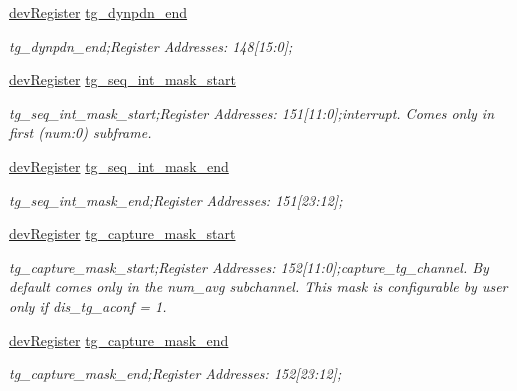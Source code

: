 \begin{DoxyCompactItemize}
\mbox{\hyperlink{classdev_register}{dev\+Register}} \mbox{\hyperlink{class_o_p_t3101_registers_a5f9e7026b200d2bcc0578376f30b9e16}{tg\+\_\+dynpdn\+\_\+end}}
\begin{DoxyCompactList}\small\item\em tg\+\_\+dynpdn\+\_\+end;Register Addresses\+: 148\mbox{[}15\+:0\mbox{]}; \end{DoxyCompactList}\item 
\mbox{\hyperlink{classdev_register}{dev\+Register}} \mbox{\hyperlink{class_o_p_t3101_registers_a7dbacbd8033f00547b6b465a49895a90}{tg\+\_\+seq\+\_\+int\+\_\+mask\+\_\+start}}
\begin{DoxyCompactList}\small\item\em tg\+\_\+seq\+\_\+int\+\_\+mask\+\_\+start;Register Addresses\+: 151\mbox{[}11\+:0\mbox{]};interrupt. Comes only in first (num\+:0) subframe. \end{DoxyCompactList}\item 
\mbox{\hyperlink{classdev_register}{dev\+Register}} \mbox{\hyperlink{class_o_p_t3101_registers_a3000807e764e22ef7ba00dd00a1c0198}{tg\+\_\+seq\+\_\+int\+\_\+mask\+\_\+end}}
\begin{DoxyCompactList}\small\item\em tg\+\_\+seq\+\_\+int\+\_\+mask\+\_\+end;Register Addresses\+: 151\mbox{[}23\+:12\mbox{]}; \end{DoxyCompactList}\item 
\mbox{\hyperlink{classdev_register}{dev\+Register}} \mbox{\hyperlink{class_o_p_t3101_registers_a4005716736ab2100c67ad96fd1ddb943}{tg\+\_\+capture\+\_\+mask\+\_\+start}}
\begin{DoxyCompactList}\small\item\em tg\+\_\+capture\+\_\+mask\+\_\+start;Register Addresses\+: 152\mbox{[}11\+:0\mbox{]};capture\+\_\+tg\+\_\+channel. By default comes only in the num\+\_\+avg subchannel. This mask is configurable by user only if dis\+\_\+tg\+\_\+aconf = \textquotesingle{}1\textquotesingle{}. \end{DoxyCompactList}\item 
\mbox{\hyperlink{classdev_register}{dev\+Register}} \mbox{\hyperlink{class_o_p_t3101_registers_a7b7451a76631c184d581daeaf8b3a6d3}{tg\+\_\+capture\+\_\+mask\+\_\+end}}
\begin{DoxyCompactList}\small\item\em tg\+\_\+capture\+\_\+mask\+\_\+end;Register Addresses\+: 152\mbox{[}23\+:12\mbox{]}; \end{DoxyCompactList}\item 

\end{DoxyCompactItemize}

